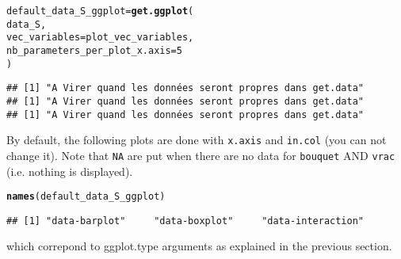 \documentclass{article}\usepackage[]{graphicx}\usepackage[]{color}
\makeatletter
\newcommand{\hlnum}[1]{\textcolor[rgb]{0.686,0.059,0.569}{#1}}%
\newcommand{\hlstd}[1]{\textcolor[rgb]{0.345,0.345,0.345}{#1}}%
\newcommand{\hlkwb}[1]{\textcolor[rgb]{0.69,0.353,0.396}{#1}}%
\newcommand{\hlkwc}[1]{\textcolor[rgb]{0.333,0.667,0.333}{#1}}%
\newcommand{\hlkwd}[1]{\textcolor[rgb]{0.737,0.353,0.396}{\textbf{#1}}}%
\newenvironment{kframe}{%
 \def\at@end@of@kframe{}%
 \ifinner\ifhmode%
  \def\at@end@of@kframe{\end{minipage}}%
  \begin{minipage}{\columnwidth}%
 \fi\fi%
 \def\FrameCommand##1{\hskip\@totalleftmargin \hskip-\fboxsep
 \colorbox{shadecolor}{##1}\hskip-\fboxsep
     \hskip-\linewidth \hskip-\@totalleftmargin \hskip\columnwidth}%
 \MakeFramed {\advance\hsize-\width
   \@totalleftmargin\z@ \linewidth\hsize
   \@setminipage}}%
 {\par\unskip\endMakeFramed%
 \at@end@of@kframe}
\newenvironment{knitrout}{}{} %
\makeatother
\begin{document}
\begin{knitrout}
\color{fgcolor}\begin{kframe}
\begin{alltt}
\hlstd{default_data_S_ggplot} \hlkwb{=} \hlkwd{get.ggplot}\hlstd{(}
        \hlstd{data_S,}
        \hlkwc{vec_variables} \hlstd{= plot_vec_variables,}
        \hlkwc{nb_parameters_per_plot_x.axis} \hlstd{=} \hlnum{5}
        \hlstd{)}
\end{alltt}


{\ttfamily\noindent\itshape{}}\begin{verbatim}
## [1] "A Virer quand les données seront propres dans get.data"
## [1] "A Virer quand les données seront propres dans get.data"
## [1] "A Virer quand les données seront propres dans get.data"
\end{verbatim}
\end{kframe}
\end{knitrout}

By default, the following plots are done with \texttt{x.axis} and \texttt{in.col} (you can not change it).
Note that \texttt{NA} are put when there are no data for \texttt{bouquet} AND \texttt{vrac} (i.e. nothing is displayed).

\begin{knitrout}
\color{fgcolor}\begin{kframe}
\begin{alltt}
\hlkwd{names}\hlstd{(default_data_S_ggplot)}
\end{alltt}
\begin{verbatim}
## [1] "data-barplot"     "data-boxplot"     "data-interaction"
\end{verbatim}
\end{kframe}
\end{knitrout}

which correpond to ggplot.type arguments as explained in the previous section.
\end{document}
